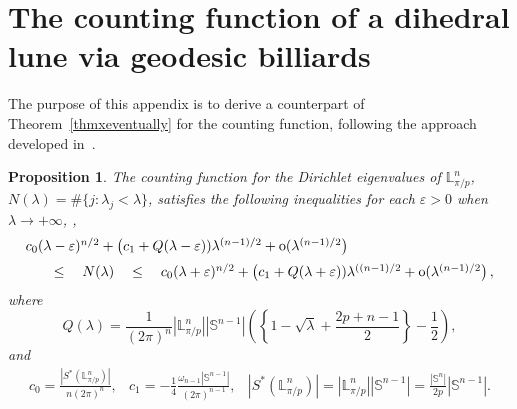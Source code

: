 \documentclass[11pt,a4paper,times]{amsart}
\theoremstyle{plain}
\newtheorem{proposition}{Proposition}[section]
\theoremstyle{definition}
\numberwithin{equation}{section}
\newcommand{\ci}{c_{1}}
\newcommand{\ds}{\displaystyle}
\newcommand{\eqskip}{ \vspace*{2mm}\\ }
\newcommand{\so}{{\rm o}}
\newcommand{\fr}[2]{\frac{\ds #1}{\ds #2}}
\newcommand{\lune}[2]{\mathbb{L}^{#1}_{#2}}
\begin{document}
{\section{The counting function of a dihedral lune via geodesic billiards\label{ApC}} The purpose of this appendix is to derive a counterpart of
Theorem~\ref{thmxeventually} for the counting function, following the approach developed in~\cite{sava}.
\begin{proposition}\label{2termsava} The counting function for the Dirichlet eigenvalues of 
$\lune{n}{\pi/p}$, $N(\lambda)=\#\{j:\lambda_j< \lambda\}$,  satisfies the following inequalities for each $\varepsilon>0$ when $\lambda \to +\infty$, \cite[(1.7.4), p. 50]{sava},
\begin{equation}\label{1.7.4}
\begin{array}{l}
c_0(\lambda-\varepsilon)^{n/2}+\left(\ci +Q(\lambda-\varepsilon))\lambda^{(n-1)/2} +\so(\lambda^{(n-1)/2}\right)\eqskip
\quad\quad\leq \quad N(\lambda)\quad \leq \quad c_0(\lambda+\varepsilon)^{n/2}+\left(\ci +Q(\lambda+\varepsilon))\lambda^{((n-1)/2}
+\so(\lambda^{(n-1)/2}\right),
\end{array}
\end{equation}
where
\[Q(\lambda)=
\frac{1}{{(2\pi)^n}}|\mathbb{L}^n_{\pi/p}||\mathbb{S}^{n-1}|\left(\left\{{1}-\sqrt{\lambda}+\frac{2p+n-1}{2}\right\}-\frac{1}{2}\right),\]
and
\begin{equation}\label{cosntantn}
\begin{array}{lll}
c_0=\fr{|S^*(\lune{n}{\pi/p})|}{n(2\pi)^n}, & \ci =-\fr{1}{4}\fr{\omega_{n-1}|\mathbb{S}^{n-1}|}{(2\pi)^{n-1}},&
|S^*(\lune{n}{\pi/p})|= |\lune{n}{\pi/p}||\mathbb{S}^{n-1}|=\fr{|\mathbb{S}^{n}|}{2p}|\mathbb{S}^{n-1}|.
\end{array}
\end{equation}


\end{proposition}}
\end{document}
